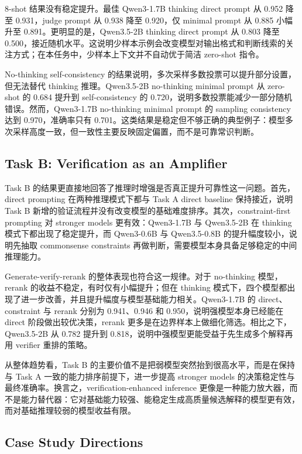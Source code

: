 8-shot 结果没有稳定提升。最佳 Qwen3-1.7B thinking direct prompt 从 0.952 降至 0.931，judge prompt 从 0.938 降至 0.920，仅 minimal prompt 从 0.885 小幅升至 0.891。更明显的是，Qwen3.5-2B thinking direct prompt 从 0.803 降至 0.500，接近随机水平。这说明少样本示例会改变模型对输出格式和判断线索的关注方式；在本任务中，少样本上下文并不自动优于简洁 zero-shot 指令。

No-thinking self-consistency 的结果说明，多次采样多数投票可以提升部分设置，但无法替代 thinking 推理。Qwen3.5-2B no-thinking minimal prompt 从 zero-shot 的 0.684 提升到 self-consistency 的 0.720，说明多数投票能减少一部分随机错误。然而，Qwen3-1.7B no-thinking minimal prompt 的 sampling consistency 达到 0.970，准确率只有 0.701。这类结果是稳定但不够正确的典型例子：模型多次采样高度一致，但一致性主要反映固定偏置，而不是可靠常识判断。

\subsection{Task B: Verification as an Amplifier}

Task B 的结果更直接地回答了推理时增强是否真正提升可靠性这一问题。首先，direct prompting 在两种推理模式下都与 Task A direct baseline 保持接近，说明 Task B 新增的验证流程并没有改变模型的基础难度排序。其次，constraint-first prompting 对 stronger models 更有效：Qwen3-1.7B 与 Qwen3.5-2B 在 thinking 模式下都出现了稳定提升，而 Qwen3-0.6B 与 Qwen3.5-0.8B 的提升幅度较小，说明先抽取 commonsense constraints 再做判断，需要模型本身具备足够稳定的中间推理能力。

Generate-verify-rerank 的整体表现也符合这一规律。对于 no-thinking 模型，rerank 的收益不稳定，有时仅有小幅提升；但在 thinking 模式下，四个模型都出现了进一步改善，并且提升幅度与模型基础能力相关。Qwen3-1.7B 的 direct、constraint 与 rerank 分别为 0.941、0.946 和 0.950，说明强模型本身已经能在 direct 阶段做出较优决策，rerank 更多是在边界样本上做细化筛选。相比之下，Qwen3.5-2B 从 0.782 提升到 0.818，说明中强模型更能受益于先生成多个解释再用 verifier 重排的策略。

从整体趋势看，Task B 的主要价值不是把弱模型突然抬到很高水平，而是在保持与 Task A 一致的能力排序前提下，进一步提高 stronger models 的决策稳定性与最终准确率。换言之，verification-enhanced inference 更像是一种能力放大器，而不是能力替代器：它对基础能力较强、能稳定生成高质量候选解释的模型更有效，而对基础推理较弱的模型收益有限。

\subsection{Case Study Directions}

